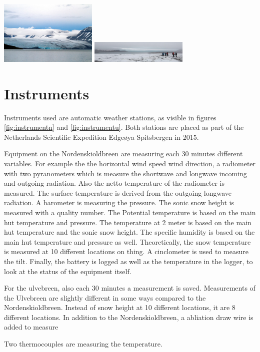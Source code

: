 \documentclass[11pt]{report}
\begin{document}
\includegraphics[scale=1, width=0.35\textwidth]{view1.jpg}
\includegraphics[scale=1, width=0.35\textwidth]{view2.jpg}

\newpage
\section{Instruments}
Instruments used are automatic weather stations, as visible in figures \ref{fig:instrumentn} and \ref{fig:instrumentu}. Both stations are placed as part of the Netherlands Scientific Expedition Edgeøya Spitsbergen in 2015.

Equipment on the Nordenskioldbreen are measuring each 30 minutes different variables. For example the the horizontal wind speed wind direction, 
a radiometer with two pyranometers which is measure the shortwave and longwave incoming and outgoing radiation.
Also the netto temperature of the radiometer is measured.
The surface temperature is derived from the outgoing longwave radiation.
A barometer is measuring the pressure. 
The sonic snow height is measured with a quality number. 
The Potential temperature is based on the main hut temperature and pressure. 
The temperature at 2 meter is based on the main hut temperature and the sonic snow height. 
The specific humidity is based on the main hut temperature and pressure as well. 
Theoretically, the snow temperature is measured at 10 different locations on thing.
A cinclometer is used to measure the tilt. 
Finally, the battery is logged as well as the temperature in the logger, to look at the status of the equipment itself. 

For the ulvebreen, also each 30 minutes a measurement is saved. Measurements of the Ulvebreen are slightly different in some ways compared to the Nordenskioldbreen. 
Instead of snow height at 10 different locations, it are 8 different locations. 
In addition to the Nordenskioldbreen, a abliation draw wire is added to measure 

Two thermocouples are measuring the temperature.
\end{document}
